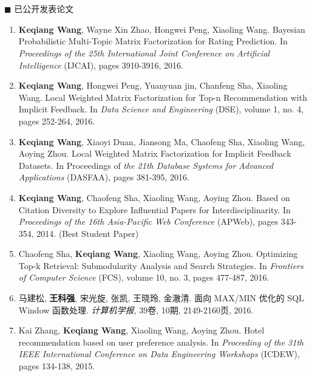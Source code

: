 \chapter*{}
{\heiti $\blacksquare$ 已公开发表论文}
	\vskip 5mm

\begin{enumerate}
	\renewcommand{\labelenumi}{[\theenumi]}
	\renewcommand\baselinestretch{1}\selectfont 	
	
	\item  \textbf{Keqiang Wang}, Wayne Xin Zhao, Hongwei Peng, Xiaoling Wang. Bayesian Probabilistic Multi-Topic Matrix Factorization for Rating Prediction. In \textit{Proceedings of the 25th International Joint Conference on Artificial Intelligence} (IJCAI), pages 3910-3916, 2016.
	
	\item \textbf{Keqiang Wang}, Hongwei Peng, Yuanyuan jin, Chanfeng Sha, Xiaoling Wang. Local Weighted Matrix Factorization for Top-n Recommendation with Implicit Feedback. In \textit{Data Science and Engineering} (DSE), volume 1, no. 4, pages 252-264, 2016.
	
	\item \textbf{Keqiang Wang}, Xiaoyi Duan, Jiansong Ma, Chaofeng Sha, Xiaoling Wang, Aoying Zhou. Local Weighted Matrix Factorization for Implicit Feedback Datasets. In Proceedings of \textit{the 21th Database Systems for Advanced Applications} (DASFAA), pages 381-395, 2016.
	
	\item \textbf{Keqiang Wang}, Chaofeng Sha, Xiaoling Wang, Aoying Zhou. Based on Citation Diversity to Explore Influential Papers for Interdisciplinarity. In \textit{Proceedings of the 16th Asia-Pacific Web Conference} (APWeb), pages 343-354, 2014. (Best Student Paper)
	
	\item Chaofeng Sha, \textbf{Keqiang Wang}, Xiaoling Wang, Aoying Zhou. Optimizing Top-k Retrieval: Submodularity Analysis and Search Strategies. In \textit{Frontiers of Computer Science} (FCS), volume 10, no. 3, pages 477-487, 2016.
	
	\item 马建松, \textbf{王科强}, 宋光旋, 张凯, 王晓玲, 金澈清. 面向 MAX/MIN 优化的 SQL Window 函数处理. \textit{计算机学报}, 39卷, 10期, 2149-2160页, 2016.
	
	\item Kai Zhang, \textbf{Keqiang Wang}, Xiaoling Wang, Aoying Zhou. Hotel recommendation based on user preference analysis. In \textit{Proceeding of the 31th IEEE International Conference on Data Engineering Workshops} (ICDEW), pages 134-138, 2015.
	

\end{enumerate}
